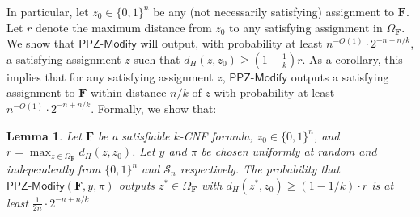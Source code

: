 \documentclass[11pt, letterpaper]{article}
\newtheorem{lemma}[theorem]{Lemma}
\theoremstyle{definition}
\newcommand{\Q}[1]{\{0,1\}^{#1}}
\newcommand{\f}{\mathbf{F}}
\newcommand{\Om}{\Omega_{\f}}
\newcommand{\PPZMod}{\textsf{PPZ-Modify}}
\begin{document}
\medskip\noindent
In particular, let $z_0 \in \Q{n}$ be any (not necessarily satisfying) assignment to $\f$. Let $r$ denote the maximum distance from $z_0$ to any satisfying assignment in $\Omega_\f$. We show that $\PPZMod$ will output, with probability at least $n^{-O(1)} \cdot 2^{-n+n/k}$, a satisfying assignment $z$ such that $d_H(z,z_0) \geq \left(1-\frac{1}{k}\right)r$. As a corollary, this implies that for any satisfying assignment $z$, $\PPZMod$ outputs a satisfying assignment to $\f$ within distance $n/k$ of $z$ with probability at least $n^{-O(1)} \cdot 2^{-n+n/k}$. Formally, we show that:
\begin{lemma}\label{lem:anchor:diam}
    Let $\f$ be a satisfiable $k$-CNF formula, $z_0 \in \{0,1\}^n$, and $r= \max_{z \in \Om} d_H (z, z_0)$. Let $y$ and $\pi$ be chosen uniformly at random and independently from $\{0,1\}^n$ and $\mathcal{S}_n$ respectively. The probability that $\PPZMod(\f, y, \pi)$ outputs $z^* \in \Om$ with $d_H(z^*,z_0) \geq \left(1-1/k\right) \cdot r$ is at least $\frac{1}{2n} \cdot 2^{-n+n/k}$
\end{lemma}
\end{document}
